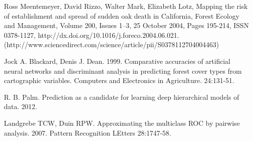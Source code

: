 \documentclass[11pt]{article}
\begin{document}
\begin{thebibliography}{}
Ross Meentemeyer, David Rizzo, Walter Mark, Elizabeth Lotz, Mapping the risk of establishment and spread of sudden oak death in California, Forest Ecology and Management, Volume 200, Issues 1–3, 25 October 2004, Pages 195-214, ISSN 0378-1127, http://dx.doi.org/10.1016/j.foreco.2004.06.021.
(http://www.sciencedirect.com/science/article/pii/S0378112704004463)

Jock A. Blackard, Denis J. Dean. 1999. Comparative accuracies of artificial neural networks and discriminant analysis in predicting forest cover types from cartographic variables. Computers and Electronics in Agriculture. 24:131-51.

R. B. Palm. Prediction as a candidate for learning deep hierarchical models of data. 2012.

Landgrebe TCW, Duin RPW. Approximating the multiclass ROC by pairwise analysis. 2007. Pattern Recognition LEtters 28:1747-58.


\end{thebibliography}
\end{document}
